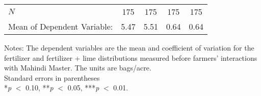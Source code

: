 \begin{table}[htbp]
\begin{threeparttable}
\begin{tabular}{l cccc}
\hline
%
$N$         &         175&         175&         175&         175\\
Mean of Dependent Variable:&        5.47&        5.51&        0.64&        0.64\\
\hline
\hline
\end{tabular}
\begin{tablenotes}
\footnotesize
\item{Notes: The dependent variables are the mean and coefficient of variation for the fertilizer and fertilizer + lime distributions measured before farmers’ interactions with Mahindi Master. The units are bags/acre. \\ Standard errors in parentheses \\ *\textit{p} $<$ 0.10, **\textit{p} $<$ 0.05, ***\textit{p} $<$ 0.01.}
\end{tablenotes}
\end{threeparttable}
\end{table}
